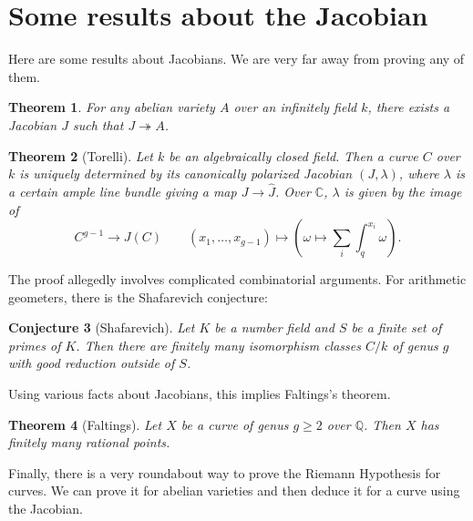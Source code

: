 \documentclass[leqno, openany]{memoir}
\newtheorem{thm}{Theorem}[section]
\newtheorem{conj}[thm]{Conjecture}
\theoremstyle{definition}
\theoremstyle{remark}
\theoremstyle{plain}
\theoremstyle{definition}
\theoremstyle{remark}
\newcommand{\C}{\mathbb{C}}
\newcommand{\Q}{\mathbb{Q}}
\newcommand{\wh}[1]{\widehat{#1}}
\begin{document}
\section{Some results about the Jacobian}%
\label{sec:some_results_about_the_jacobian}

Here are some results about Jacobians. We are very far away from proving any of them.

\begin{thm}
    For any abelian variety $A$ over an infinitely field $k$, there exists a Jacobian $J$ such that $J \twoheadrightarrow A$.
\end{thm}

\begin{thm}[Torelli]
    Let $k$ be an algebraically closed field. Then a curve $C$ over $k$ is uniquely determined by its canonically polarized Jacobian $(J, \lambda)$, where $\lambda$ is a certain ample line bundle giving a map $J \to \wh{J}$. Over $\C$, $\lambda$ is given by the image of 
    \[ C^{g-1} \to J(C) \qquad (x_1, \ldots, x_{g-1}) \mapsto (\omega \mapsto \sum_i \int_q^{x_i} \omega). \]
\end{thm}

The proof allegedly involves complicated combinatorial arguments. For arithmetic geometers, there is the Shafarevich conjecture:

\begin{conj}[Shafarevich]
    Let $K$ be a number field and $S$ be a finite set of primes of $K$. Then there are finitely many isomorphism classes $C/k$ of genus $g$ with good reduction outside of $S$.
\end{conj}

Using various facts about Jacobians, this implies Faltings's theorem.

\begin{thm}[Faltings]
    Let $X$ be a curve of genus $g \geq 2$ over $\Q$. Then $X$ has finitely many rational points.
\end{thm}

Finally, there is a very roundabout way to prove the Riemann Hypothesis for curves. We can prove it for abelian varieties and then deduce it for a curve using the Jacobian.
\end{document}
